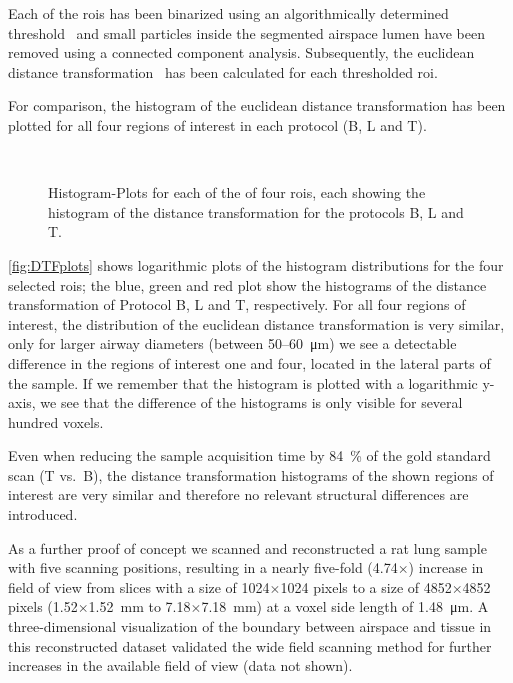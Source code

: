 Each of the \acp{roi} has been binarized using an algorithmically determined threshold~\cite{Otsu1979} and small particles inside the segmented airspace lumen have been removed using a connected component analysis. Subsequently, the euclidean distance transformation~\cite{Danielsson1980} has been calculated for each thresholded \ac{roi}.

For comparison, the histogram of the euclidean distance transformation has been plotted for all four regions of interest in each protocol (B, L and T).

\renewcommand{\imsize}{0.705\linewidth}%
\begin{figure}[htb]%
	\noindent\makebox[\textwidth]{%
		\subfloat{}%
		\subfloat{}%
	}%
	\\%
	\noindent\makebox[\textwidth]{%
		\subfloat{}%
		\subfloat{}%
	}%
	\caption[Histogram-Plots]{Histogram-Plots for each of the of four \acp{roi}, each showing the histogram of the distance transformation for the protocols B, L and T.}%
	\label{fig:DTFplots}
\end{figure}%

\autoref{fig:DTFplots} shows logarithmic plots of the histogram distributions for the four selected \acp{roi}; the blue, green and red plot show the histograms of the distance transformation of Protocol B, L and T, respectively. For all four regions of interest, the distribution of the euclidean distance transformation is very similar, only for larger airway diameters (between 50--\SI{60}{\micro\meter}) we see a detectable difference in the regions of interest one and four, located in the lateral parts of the sample. If we remember that the histogram is plotted with a logarithmic y-axis, we see that the difference of the histograms is only visible for several hundred voxels.

Even when reducing the sample acquisition time by \SI{84}{\percent} of the gold standard scan (T vs.\ B), the distance transformation histograms of the shown regions of interest are very similar and therefore no relevant structural differences are introduced.

As a further proof of concept we scanned and reconstructed a rat lung sample with five scanning positions, resulting in a nearly five-fold (4.74$\times$) increase in field of view from slices with a size of 1024$\times$1024 pixels to a size of 4852$\times$4852 pixels (1.52$\times$\SI{1.52}{\milli\meter} to 7.18$\times$\SI{7.18}{\milli\meter}) at a voxel side length of \SI{1.48}{\micro\meter}. A three-dimensional visualization of the boundary between airspace and tissue in this reconstructed dataset validated the wide field scanning method for further increases in the available field of view (data not shown).

